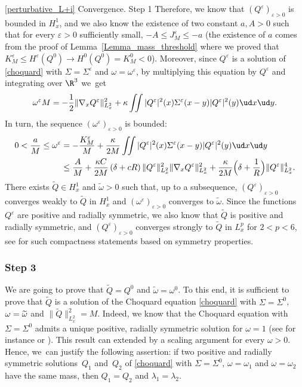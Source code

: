 \begin{ProofOf}{\eqref{perturbative_L+i} Convergence. Step 1}
Therefore, we know that $(Q^{\varepsilon})_{\varepsilon>0}$ is bounded in $H_{x}^{1}$, and we also know the existence of two constant $a,A>0$ such that for every $\varepsilon>0$ sufficiently small, \hbox{$-A\leq J_{M}^{\varepsilon}\leq -a$} (the existence of $a$ comes from the proof of Lemma~\ref{Lemma_mass_threshold} where we proved that \hbox{$K_{M}^{\varepsilon}\leq H^{\varepsilon}(Q^{0})\to H^{0}(Q^{0})=K_{M}^{0}<0$}). Moreover, since $Q^{\varepsilon}$ is a solution of \eqref{choquard} with $\Sigma=\Sigma^{\varepsilon}$ and $\omega=\omega^{\varepsilon}$, by multiplying this equation by $Q^{\varepsilon}$ and integrating over $\R^{3}$ we~get
\[
\omega^{\varepsilon}M=-\frac{1}{2}\|\nabla_{x}Q^{\varepsilon}\|_{L_{x}^{2}}^{2}+\kappa\iint|Q^{\varepsilon}|^{2}(x)\Sigma^{\varepsilon}(x-y)|Q^{\varepsilon}|^{2}(y)\ud x\ud y.
\]
In turn, the sequence $(\omega^{\varepsilon})_{\varepsilon>0}$ is bounded:
\begin{align*}
0<\frac{a}{M}\leq\omega^{\varepsilon}&=-\frac{K_{M}^{\varepsilon}}{M}+\frac{\kappa}{2M}\iint|Q^{\varepsilon}|^{2}(x)\Sigma^{\varepsilon}(x-y)|Q^{\varepsilon}|^{2}(y)\ud x\ud y\\
&\leq\frac{A}{M}+\frac{\kappa C}{2M}\left(\delta+cR\right)\|Q^{\varepsilon}\|_{L_{x}^{2}}^{2}\|\nabla_{x}Q^{\varepsilon}\|_{L_{x}^{2}}^{2}+\frac{\kappa}{2M}\Bigl(\delta+\frac{1}{R} \Bigr)\|Q^{\varepsilon}\|_{L_{x}^{2}}^{4}.
\end{align*}
There exists $\widetilde{Q}\in H_{x}^{1}$ and $\widetilde{\omega}>0$ such that, up to a subsequence, $(Q^{\varepsilon})_{\varepsilon>0}$ converges weakly to $\widetilde{Q}$ in $H_{x}^{1}$ and $(\omega^{\varepsilon})_{\varepsilon>0}$ converges to $\widetilde{\omega}$. Since the functions $Q^{\varepsilon}$ are positive and radially symmetric,
we also know that $\widetilde{Q}$ is positive and radially symmetric, and $(Q^{\varepsilon})_{\varepsilon>0}$ converges strongly to $\widetilde{Q}$ in $L_{x}^{p}$ for $2<p<6$,
see \cite{Pllsc,Strauss} for such compactness statements based on symmetry properties.

\subsubsection*{Step 3} We are going to prove that $\widetilde{Q}=Q^{0}$ and $\widetilde{\omega}=\omega^{0}$. To this end, it is sufficient to prove that $\widetilde{Q}$ is a solution of the Choquard equation \eqref{choquard} with $\Sigma=\Sigma^{0}$, $\omega=\nobreak\widetilde{\omega}$ and $\|\widetilde{Q}\|_{L_{x}^{2}}^{2}=M$. Indeed, we know that the Choquard equation with $\Sigma=\Sigma^{0}$ admits a unique positive, radially symmetric solution for $\omega=1$ (see for instance \cite{Lieb_Choquard} or \cite[App.\,A]{Lenzmann}).
This result can extended by a scaling argument for every $\omega>0$.
Hence, we~can justify the following assertion: if two positive and radially symmetric solutions~$Q_{1}$ and~$Q_{2}$ of \eqref{choquard} with $\Sigma=\Sigma^{0}$, $\omega=\omega_{1}$ and $\omega=\omega_{2}$ have the same mass, then $Q_{1}=Q_{2}$ and $\lambda_{1}=\lambda_{2}$.


\end{ProofOf}
